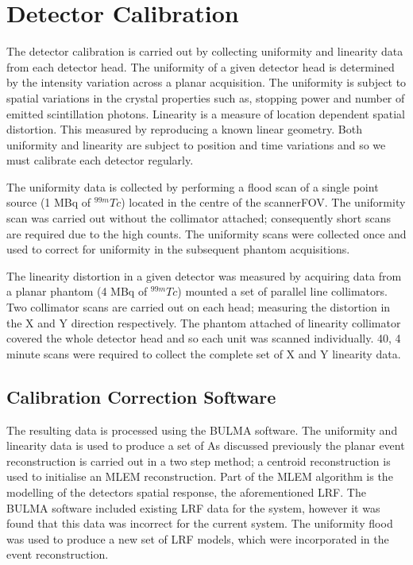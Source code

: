 \section{Detector Calibration}
The detector calibration is carried out by collecting uniformity and linearity data from each detector head. The uniformity of a given detector head is determined by the intensity variation across a planar acquisition. The uniformity is subject to spatial variations in the crystal properties such as, stopping power and number of emitted scintillation photons. Linearity is a measure of location dependent spatial distortion. This measured by reproducing a known linear geometry. Both uniformity and linearity are subject to position and time variations and so we must calibrate each detector regularly.

The uniformity data is collected by performing a flood scan of a single point source (1 MBq of $^{99m}Tc$) located in the centre of the scanner\acrshort{FOV}. The uniformity scan was carried out without the collimator attached; consequently short scans are required due to the high counts. The uniformity scans were collected once and used to correct for uniformity in the subsequent phantom acquisitions. 

The linearity distortion in a given detector was measured by acquiring data from a planar phantom (4 MBq of $^{99m}Tc$) mounted a set of parallel line collimators. Two collimator scans are carried out on each head; measuring the distortion in the X and Y direction respectively. The phantom attached of linearity collimator covered the whole detector head and so each unit was scanned individually. 40, 4 minute scans were required to collect the complete set of X and Y linearity data. 

\subsection{Calibration Correction Software}
The resulting data is processed using the BULMA software. The uniformity and linearity data is used to produce a set of  
As discussed previously the planar event reconstruction is carried out in a two step method; a centroid reconstruction is used to initialise an \acrshort{MLEM} reconstruction. Part of the \acrshort{MLEM} algorithm is the modelling of the detectors spatial response, the aforementioned \acrshort{LRF}. The BULMA software included existing \acrshort{LRF} data for the system, however it was found that this data was incorrect for the current system. The uniformity flood was used to produce a new set of \acrshort{LRF} models, which were incorporated in the event reconstruction.

